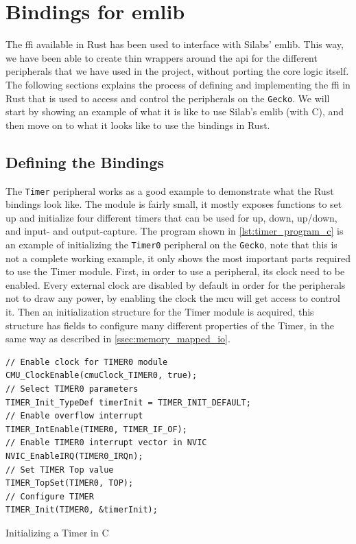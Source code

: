 
\section{Bindings for emlib}
\label{sub:interfacing_with_emlib}

The \gls{ffi} available in Rust has been used to interface with Silabs' emlib.
This way, we have been able to create thin wrappers around the \gls{api} for the different peripherals that we have used in the project, without porting the core logic itself.
The following sections explains the process of defining and implementing the \gls{ffi} in Rust that is used to access and control the peripherals on the \texttt{Gecko}.
We will start by showing an example of what it is like to use Silab's emlib (with C), and then move on to what it looks like to use the bindings in Rust.

\subsection{Defining the Bindings}

The \texttt{Timer} peripheral \cite{an0014_timer} works as a good example to demonstrate what the Rust bindings look like.
The module is fairly small, it mostly exposes functions to set up and initialize four different timers that can be used for up, down, up/down, and input- and output-capture.
The program shown in \autoref{lst:timer_program_c} is an example of initializing the \texttt{Timer0} peripheral on the \texttt{Gecko}, note that this is not a complete working example, it only shows the most important parts required to use the Timer module.
First, in order to use a peripheral, its clock need to be enabled.
Every external clock are disabled by default  in order for the peripherals not to draw any power, by enabling the clock the \gls{mcu} will get access to control it.
Then an initialization structure for the Timer module is acquired, this structure has fields to configure many different properties of the Timer, in the same way as described in \autoref{ssec:memory_mapped_io}.

\begin{listing}[h]
\begin{verbatim}
// Enable clock for TIMER0 module
CMU_ClockEnable(cmuClock_TIMER0, true);
// Select TIMER0 parameters
TIMER_Init_TypeDef timerInit = TIMER_INIT_DEFAULT;
// Enable overflow interrupt
TIMER_IntEnable(TIMER0, TIMER_IF_OF);
// Enable TIMER0 interrupt vector in NVIC
NVIC_EnableIRQ(TIMER0_IRQn);
// Set TIMER Top value
TIMER_TopSet(TIMER0, TOP);
// Configure TIMER
TIMER_Init(TIMER0, &timerInit);
\end{verbatim}
\caption{Initializing a Timer in C}
\label{lst:timer_program_c}
\end{listing}

